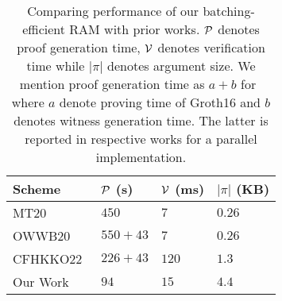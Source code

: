 \begin{table}[htbp]
    \centering
    \begin{tabularx}{0.8\textwidth}{@{}XXXX@{}}
        \toprule
        Scheme & $\mathcal{P}$ (s) & $\mathcal{V}$ (ms) & $|\pi|$ (KB) \\ \midrule
        MT20 & $450$ & $7$  & $0.26$ \\
        OWWB20~\cite{USENIX:OWWB20} & $550+43$ & $7$  & $0.26$ \\
        CFHKKO22~\cite{CCS:CFHKKO22} & $226+43$ & $120$ & $1.3$ \\
        Our Work & $94$ & $15$ & $4.4$ \\
        \bottomrule
    \end{tabularx}
    \caption{Comparing performance of our batching-efficient RAM with prior works. $\mathcal{P}$
    denotes proof generation time, $\mathcal{V}$ denotes verification time while $|\pi|$ denotes
    argument size. We mention proof generation time as $a+b$ for~\cite{USENIX:OWWB20,CCS:CFHKKO22}
    where $a$ denote proving time of \textsf{Groth16} and $b$ denotes witness generation time. The latter
    is reported in respective works for a parallel implementation.}
    \label{tbl:performance-comparison}
    \vspace*{-5mm}
\end{table}




